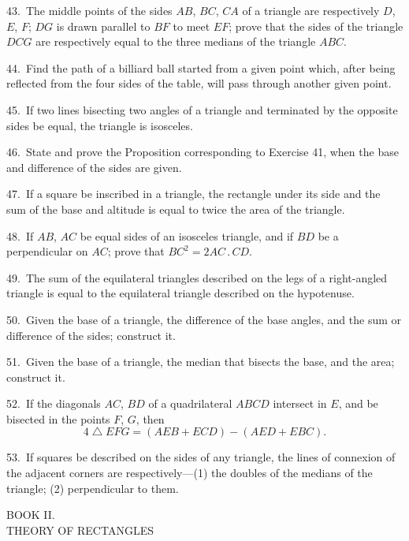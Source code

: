 \documentclass[oneside]{book}
\newcommand{\ibksp}{\hspace{-1.5em}}
\begin{document}
\begin{footnotesize}
43.~The middle points of the sides $AB$, $BC$, $CA$ of a triangle
are respectively $D$, $E$, $F$; $DG$ is drawn parallel to $BF$ to meet
$EF$; prove that the sides of the triangle $DCG$ are respectively
equal to the three medians of the triangle $ABC$.

44.~Find the path of a billiard ball started from a given point
which, after being reflected from the four sides of the table, will
pass through another given point.


45.~If two lines bisecting two angles of a triangle and terminated
by the opposite sides be equal, the triangle is isosceles.

46.~State and prove the Proposition corresponding to Exercise
41, when the base and difference of the sides are given.

47.~If a square be inscribed in a triangle, the rectangle under
its side and the sum of the base and altitude is equal to twice the
area of the triangle.

48.~If $AB$, $AC$ be equal sides of an isosceles triangle, and if
$BD$ be a perpendicular on $AC$; prove that $BC^2 = 2AC\,.\,CD$.

49.~The sum of the equilateral triangles described on the legs
of a right-angled triangle is equal to the equilateral triangle described
on the hypotenuse.

50.~Given the base of a triangle, the difference of the base
angles, and the sum or difference of the sides; construct it.

51.~Given the base of a triangle, the median that bisects the
base, and the area; construct it.

52.~If the diagonals $AC$, $BD$ of a quadrilateral $ABCD$ intersect
in $E$, and be bisected in the points $F$, $G$, then
\[
4 \; \triangle \; EFG = (AEB + ECD)-(AED + EBC).
\]

53.~If squares be described on the sides of any triangle, the
lines of connexion of the adjacent corners are respectively---(1) the
doubles of the medians of the triangle; (2) perpendicular to
them.
\par\end{footnotesize}




\newpage\begin{center}{\LARGE BOOK II\@.} \bigskip\\{\large \uppercase{Theory of Rectangles}}\\ \bigskip
{}
\addcontentsline{toc}{section}{\protect \ibksp\textsf{Theory of Rectangles,}}
\end{center}
\end{document}
